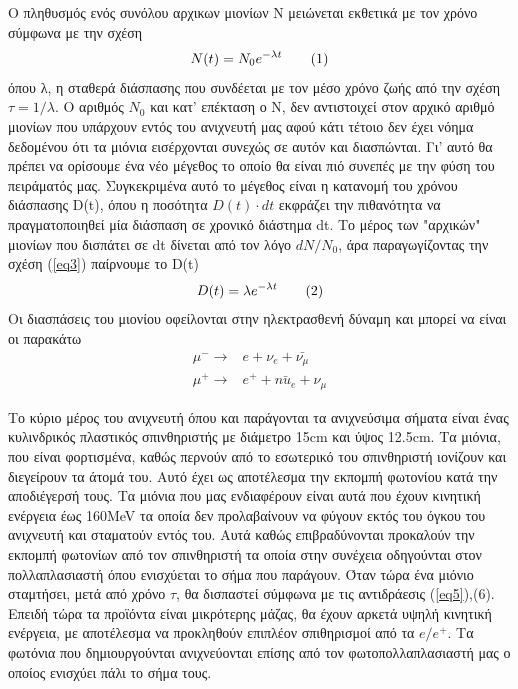 \documentclass[a4paper]{book}
\newcommand\numberthis{\addtocounter{equation}{1}\tag{\theequation}}
\begin{document}
	Ο πληθυσμός ενός συνόλου αρχικων μιονίων Ν μειώνεται εκθετικά με τον χρόνο σύμφωνα με την σχέση 
	\begin{align*}\label{eq3}
		N(t) = N_0 e^{-\lambda t} \numberthis
	\end{align*}
	όπου  λ, η σταθερά διάσπασης που συνδέεται με τον μέσο χρόνο ζωής από την σχέση $\tau=1/\lambda$.
	Ο αριθμός $N_0$ και κατ' επέκταση ο N, δεν  αντιστοιχεί στον αρχικό αριθμό μιονίων που υπάρχουν εντός του ανιχνευτή μας αφού κάτι τέτοιο δεν έχει νόημα δεδομένου ότι τα μιόνια εισέρχονται συνεχώς σε αυτόν και διασπώνται.
	 Γι' αυτό θα πρέπει να ορίσουμε ένα νέο μέγεθος το οποίο θα είναι πιό συνεπές με την φύση του πειράματός μας.
	  Συγκεκριμένα αυτό το μέγεθος είναι η κατανομή του χρόνου διάσπασης D(t), όπου η ποσότητα $D(t)\cdot dt$ εκφράζει την πιθανότητα να πραγματοποιηθεί μία διάσπαση σε χρονικό διάστημα dt. Το μέρος των "αρχικών" μιονίων που δισπάτει σε dt δίνεται από τον λόγο $dN/N_0$, άρα παραγωγίζοντας την σχέση (\ref{eq3}) παίρνουμε το D(t)
	\begin{align*}\label{eq4}
		D(t) = \lambda e^{-\lambda t} \numberthis
	\end{align*}	
Οι διασπάσεις του μιονίου οφείλονται στην ηλεκτρασθενή δύναμη και μπορεί να είναι οι παρακάτω 
	\begin{align}\label{eq5}
		\mu^- \rightarrow& e   + \nu_e + \bar{\nu_\mu} \\ 
		\mu^+ \rightarrow& e^+ + \bar{nu_e} + \nu_\mu 
	\end{align}
	
	
	Το κύριο μέρος του ανιχνευτή όπου και παράγονται τα ανιχνεύσιμα σήματα είναι ένας κυλινδρικός πλαστικός σπινθηριστής με διάμετρο 15cm και ύψος 12.5cm. 
	Τα μιόνια, που είναι φορτισμένα, καθώς περνούν από το εσωτερικό του σπινθηριστή ιονίζουν και διεγείρουν τα άτομά του. Αυτό έχει ως αποτέλεσμα την εκπομπή φωτονίου κατά την αποδιέγερσή τους. 
	Τα μιόνια που μας ενδιαφέρουν είναι αυτά που έχουν κινητική ενέργεια έως 160MeV τα οποία δεν προλαβαίνουν να φύγουν εκτός του όγκου του ανιχνευτή και σταματούν εντός του. 
	Αυτά καθώς επιβραδύνονται προκαλούν την εκπομπή φωτονίων από τον σπινθηριστή τα οποία στην συνέχεια οδηγούνται στον πολλαπλασιαστή όπου ενισχύεται το σήμα που παράγουν. 
	Όταν τώρα ένα μιόνιο σταμτήσει, μετά από χρόνο $\tau$, θα δισπαστεί σύμφωνα με τις αντιδράεσις (\ref{eq5}),(6). Επειδή τώρα τα προϊόντα είναι μικρότερης μάζας, θα έχουν αρκετά υψηλή κινητική ενέργεια, με αποτέλεσμα να προκληθούν επιπλέον σπιθηρισμοί από τα $e/e^+$. Τα φωτόνια που δημιουργούνται ανιχνεύονται επίσης από τον φωτοπολλαπλασιαστή μας ο οποίος ενισχύει πάλι το σήμα τους. 
	
\end{document}
